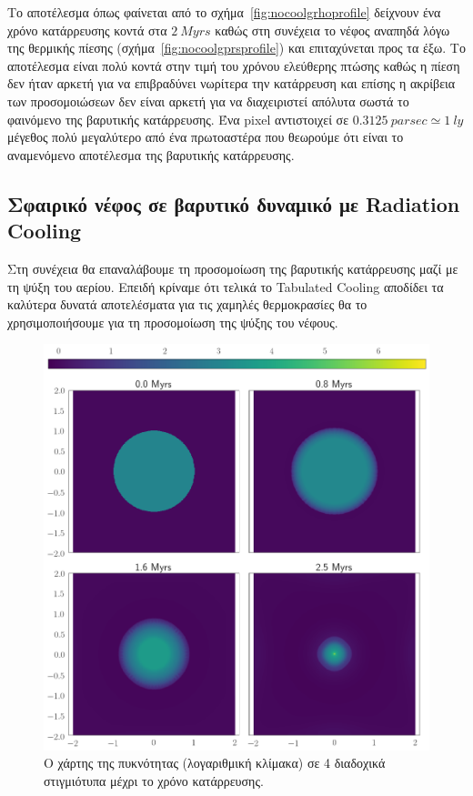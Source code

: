 Το αποτέλεσμα όπως φαίνεται από το σχήμα~\ref{fig:nocoolgrhoprofile} δείχνουν ένα χρόνο κατάρρευσης κοντά στα $\SI{2}{Myrs}$ καθώς στη συνέχεια το νέφος αναπηδά λόγω της θερμικής πίεσης (σχήμα~\ref{fig:nocoolgprsprofile}) και επιταχύνεται προς τα έξω.
Το αποτέλεσμα είναι πολύ κοντά στην τιμή του χρόνου ελεύθερης πτώσης καθώς η πίεση δεν ήταν αρκετή για να επιβραδύνει νωρίτερα την κατάρρευση και επίσης η ακρίβεια των προσομοιώσεων δεν είναι αρκετή για να διαχειριστεί απόλυτα σωστά το φαινόμενο της βαρυτικής κατάρρευσης. Ένα pixel αντιστοιχεί σε $\SI{0.3125}{parsec}\simeq \SI{1}{ly}$ μέγεθος πολύ μεγαλύτερο από ένα πρωτοαστέρα που θεωρούμε ότι είναι το αναμενόμενο αποτέλεσμα της βαρυτικής κατάρρευσης.

\subsection{Σφαιρικό νέφος σε βαρυτικό δυναμικό με Radiation Cooling}

Στη συνέχεια θα επαναλάβουμε τη προσομοίωση της βαρυτικής κατάρρευσης μαζί με τη ψύξη του αερίου.
Επειδή κρίναμε ότι τελικά το Tabulated Cooling αποδίδει τα καλύτερα δυνατά αποτελέσματα για τις χαμηλές θερμοκρασίες θα το χρησιμοποιήσουμε για τη προσομοίωση της ψύξης του νέφους.
\begin{figure}[h]
	\centering
	\includegraphics[width=1\linewidth]{DataImages/H2CoolGRquad}
	\caption{Ο χάρτης της πυκνότητας (λογαριθμική κλίμακα) σε 4 διαδοχικά στιγμιότυπα μέχρι το χρόνο κατάρρευσης. }
	\label{fig:h2coolgrquad}
\end{figure}

